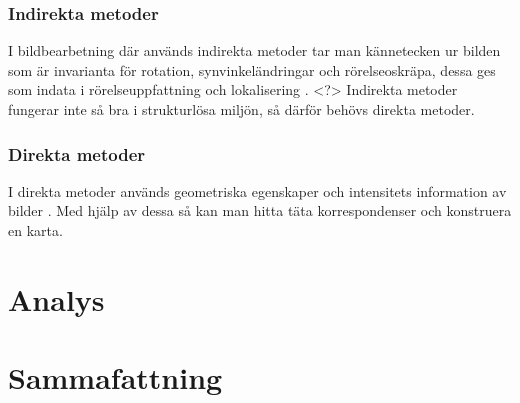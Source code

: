 \subsection{Indirekta metoder}

I bildbearbetning där används indirekta metoder tar man kännetecken ur bilden som är invarianta för rotation, synvinkeländringar och rörelseoskräpa, dessa ges som indata i rörelseuppfattning och lokalisering \citep{geospatial}. <?> Indirekta metoder fungerar inte så bra i strukturlösa miljön, så därför behövs direkta metoder. 

\subsection{Direkta metoder}

I direkta metoder används geometriska egenskaper och intensitets information av bilder \citep{geospatial}. Med hjälp av dessa så kan man hitta täta korrespondenser och konstruera en karta. 

\chapter{Analys}

\chapter{Sammafattning}

